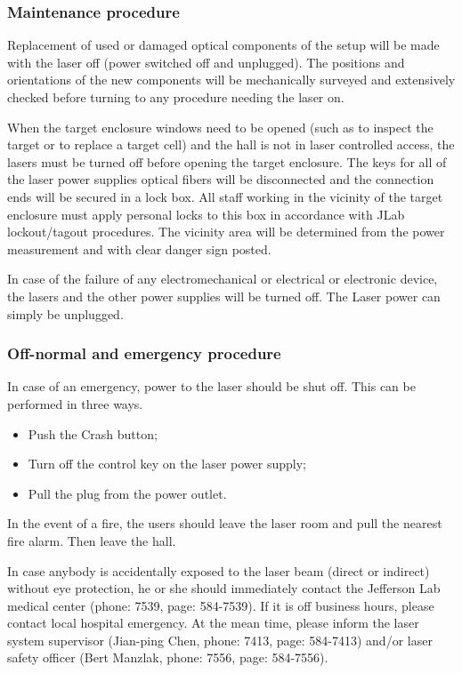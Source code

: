 {\subsubsection{Maintenance procedure}

Replacement of used or damaged optical components of the setup will be made with the
laser off (power switched off and unplugged).  The positions and 
orientations of the new components will be mechanically
surveyed and extensively checked before turning to any procedure needing the laser on.

When the target enclosure windows need to be opened (such as to inspect
the target or to replace a 
target cell) and the hall is not in laser controlled access, 
the lasers must be turned off before opening the target enclosure.
The 
keys for all of the laser power supplies 
optical fibers will be disconnected and the connection ends
will be secured in a lock box.  All staff working in the
vicinity of the target enclosure 
must apply personal locks to this box in accordance with
JLab lockout/tagout procedures.
The vicinity area will be determined
from the power measurement and with clear danger sign posted.

In case of the failure of any electromechanical or electrical or electronic device,
the lasers and the other power supplies will be turned off. The Laser power
can simply be unplugged.


\subsubsection{Off-normal and emergency procedure}

In case of an emergency, power to the laser should be shut off.
This can be performed in three ways.
\begin {itemize}
\item Push the Crash button;
\item Turn off the control key on the laser power supply;
\item Pull the plug from the power outlet.
\end {itemize}

In the event of a fire, the users should leave the laser room and pull the 
nearest fire alarm. Then leave the hall.

In case anybody is accidentally exposed to the laser beam (direct or indirect)
without eye protection, he or she should immediately contact the Jefferson
Lab medical center (phone: 7539, page: 584-7539). If it is 
off business hours, please contact local hospital emergency. At the mean time,
please inform the laser system supervisor (Jian-ping Chen, phone: 7413,
page: 584-7413) and/or laser safety officer (Bert Manzlak, phone: 7556,
page: 584-7556). 


}
